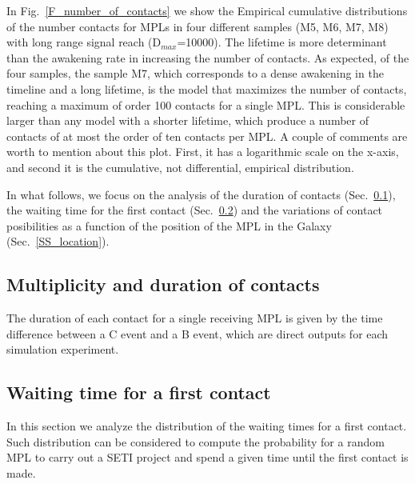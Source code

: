 \documentclass[crop]{CSLB}%
\begin{document}
In Fig.~\ref{F_number_of_contacts} we show the Empirical cumulative
distributions of the number contacts for MPLs in four different
samples (M5, M6, M7, M8) with long range signal reach
(D$_{max}$=10000). 
%
The lifetime is more determinant than the awakening rate in increasing
the number of contacts.
%
As expected, of the four samples, the sample M7, which corresponds to
a dense awakening in the timeline and a long lifetime, is the model
that maximizes the number of contacts, reaching a maximum of order 100
contacts for a single MPL.
%
This is considerable larger than any model with a shorter lifetime,
which produce a number of contacts of at most the order of ten
contacts per MPL.
%
A couple of comments are worth to mention about this plot.
%
First, it has a logarithmic scale on the x-axis, and second it is the
cumulative, not differential, empirical distribution.
 

In what follows, we focus on the analysis of the duration of contacts
(Sec.~\ref{SS_multiplicity}), the waiting time for the first contact
(Sec.~\ref{SS_waiting}) and the
variations of contact posibilities as a function of the position of
the MPL in the Galaxy (Sec.~\ref{SS_location}).


\subsection{Multiplicity and duration of contacts}\label{SS_multiplicity}

The duration of each contact for a single receiving MPL is given by the
time difference between a C event and a B event, which are direct
outputs for each simulation experiment.





\subsection{Waiting time for a first contact}\label{SS_waiting}

In this section we analyze the distribution of the waiting times for
a first contact.
%
Such distribution can be considered to compute the probability for a
random MPL to carry out a SETI project and spend a given time until
the first contact is made. 
\end{document}
